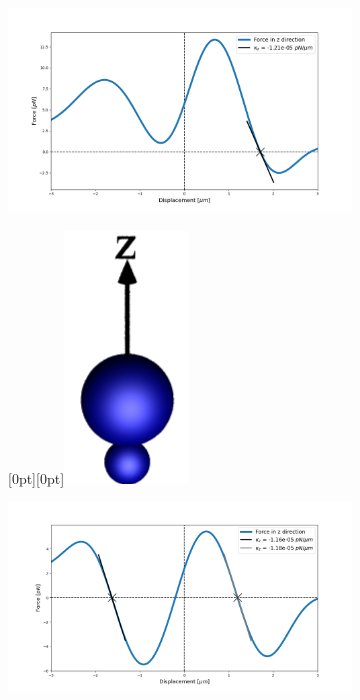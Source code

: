 \begin{figure}[h!]
	\centering
	\begin{subfigure}{.75\linewidth}
		\includegraphics[width=\linewidth]{lam=2_theta=0.png}
		\caption{}
		\label{lam=2}
	\end{subfigure}\hfill %
	\begin{subfigure}{.25\linewidth}
		\centering
		\raisebox{50pt}[0pt][0pt]{\makebox{}\includegraphics[width=0.3\linewidth, keepaspectratio]{theta=0.png}}
		\caption{}
		\label{large over small}
	\end{subfigure}
	\medskip
	\begin{subfigure}{.75\linewidth}
		\includegraphics[width=\linewidth]{lam=2_theta=180.png}

\end{subfigure}
\end{figure}
